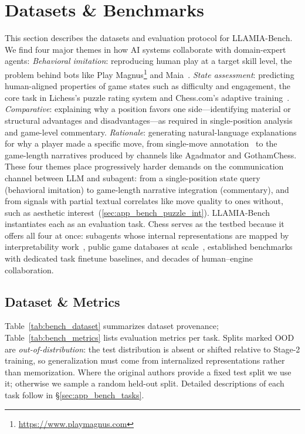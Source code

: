 \section{Datasets \& Benchmarks}
\label{sec:app_bench}

This section describes the datasets and evaluation protocol for LLAMIA-Bench.
We find four major themes in how AI systems collaborate with domain-expert agents:
\emph{Behavioral imitation}: reproducing human play at a target skill level, the problem behind bots like Play Magnus\footnote{\url{https://www.playmagnus.com}} and Maia~\citep{mcilroy2020aligning}.
\emph{State assessment}: predicting human-aligned properties of game states such as difficulty and engagement, the core task in Lichess's puzzle rating system and Chess.com's adaptive training~\citep{lichess2024puzzles}.
\emph{Comparative}: explaining why a position favors one side---identifying material or structural advantages and disadvantages---as required in single-position analysis~\citep{jhamtani-etal-2018-learning} and game-level commentary.
\emph{Rationale}: generating natural-language explanations for why a player made a specific move, from single-move annotation~\citep{jhamtani-etal-2018-learning,zang2019automated} to the game-length narratives produced by channels like Agadmator and GothamChess.
These four themes place progressively harder demands on the communication channel between LLM and subagent: from a single-position state query (behavioral imitation) to game-length narrative integration (commentary), and from signals with partial textual correlates like move quality to ones without, such as aesthetic interest~(\cref{sec:app_bench_puzzle_int}).
LLAMIA-Bench instantiates each as an evaluation task.
Chess serves as the testbed because it offers all four at once: subagents whose internal representations are mapped by interpretability work~\citep{jenner2024evidence}, public game databases at scale~\citep{Lichess,Caissabase}, established benchmarks with dedicated task finetune baselines, and decades of human--engine collaboration.

\subsection{Dataset \& Metrics}
\label{sec:app_bench_dataset}
\label{sec:app_reward}

Table~\ref{tab:bench_dataset} summarizes dataset provenance;
Table~\ref{tab:bench_metrics} lists evaluation metrics per task.
Splits marked OOD are \emph{out-of-distribution}: the test distribution is absent or shifted relative to Stage-2 training, so generalization must come from internalized representations rather than memorization.
Where the original authors provide a fixed test split we use it; otherwise we sample a random held-out split.
Detailed descriptions of each task follow in \S\ref{sec:app_bench_tasks}.

